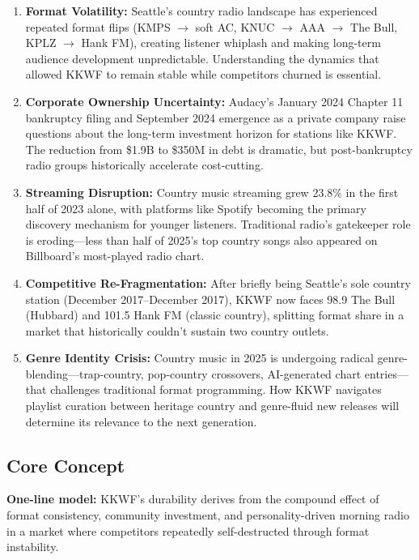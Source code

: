 \documentclass[11pt,letterpaper]{article}
\begin{document}
\begin{enumerate}[leftmargin=2em]
\item \textbf{Format Volatility:} Seattle's country radio landscape has experienced repeated format flips (KMPS $\rightarrow$ soft AC, KNUC $\rightarrow$ AAA $\rightarrow$ The Bull, KPLZ $\rightarrow$ Hank FM), creating listener whiplash and making long-term audience development unpredictable. Understanding the dynamics that allowed KKWF to remain stable while competitors churned is essential.

\item \textbf{Corporate Ownership Uncertainty:} Audacy's January 2024 Chapter 11 bankruptcy filing and September 2024 emergence as a private company raise questions about the long-term investment horizon for stations like KKWF. The reduction from \$1.9B to \$350M in debt is dramatic, but post-bankruptcy radio groups historically accelerate cost-cutting.

\item \textbf{Streaming Disruption:} Country music streaming grew 23.8\% in the first half of 2023 alone, with platforms like Spotify becoming the primary discovery mechanism for younger listeners. Traditional radio's gatekeeper role is eroding---less than half of 2025's top country songs also appeared on Billboard's most-played radio chart.

\item \textbf{Competitive Re-Fragmentation:} After briefly being Seattle's sole country station (December 2017--December 2017), KKWF now faces 98.9 The Bull (Hubbard) and 101.5 Hank FM (classic country), splitting format share in a market that historically couldn't sustain two country outlets.

\item \textbf{Genre Identity Crisis:} Country music in 2025 is undergoing radical genre-blending---trap-country, pop-country crossovers, AI-generated chart entries---that challenges traditional format programming. How KKWF navigates playlist curation between heritage country and genre-fluid new releases will determine its relevance to the next generation.
\end{enumerate}

\subsection{Core Concept}

\textbf{One-line model:} KKWF's durability derives from the compound effect of format consistency, community investment, and personality-driven morning radio in a market where competitors repeatedly self-destructed through format instability.
\end{document}
